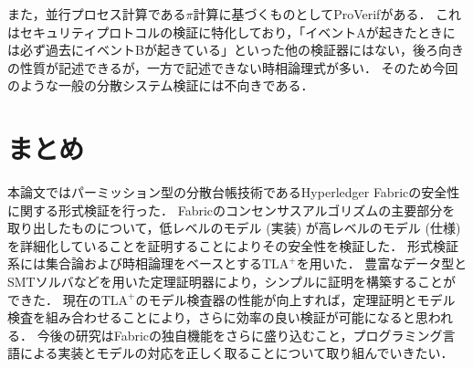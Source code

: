 \documentclass{fose2019}           %
\newcommand{\TLA}{$\text{TLA}^{+}$}
\begin{document}
また，並行プロセス計算である$\pi$計算に基づくものとしてProVerifがある．
これはセキュリティプロトコルの検証に特化しており，「イベントAが起きたときには必ず過去にイベントBが起きている」といった他の検証器にはない，後ろ向きの性質が記述できるが，一方で記述できない時相論理式が多い．
そのため今回のような一般の分散システム検証には不向きである．

\section{まとめ}
本論文ではパーミッション型の分散台帳技術であるHyperledger Fabricの安全性に関する形式検証を行った．
Fabricのコンセンサスアルゴリズムの主要部分を取り出したものについて，低レベルのモデル (実装) が高レベルのモデル (仕様) を詳細化していることを証明することによりその安全性を検証した．
形式検証系には集合論および時相論理をベースとする\TLA を用いた．
豊富なデータ型とSMTソルバなどを用いた定理証明器により，シンプルに証明を構築することができた．
現在の\TLA のモデル検査器の性能が向上すれば，定理証明とモデル検査を組み合わせることにより，さらに効率の良い検証が可能になると思われる．
今後の研究はFabricの独自機能をさらに盛り込むこと，プログラミング言語による実装とモデルの対応を正しく取ることについて取り組んでいきたい．

\end{document}
